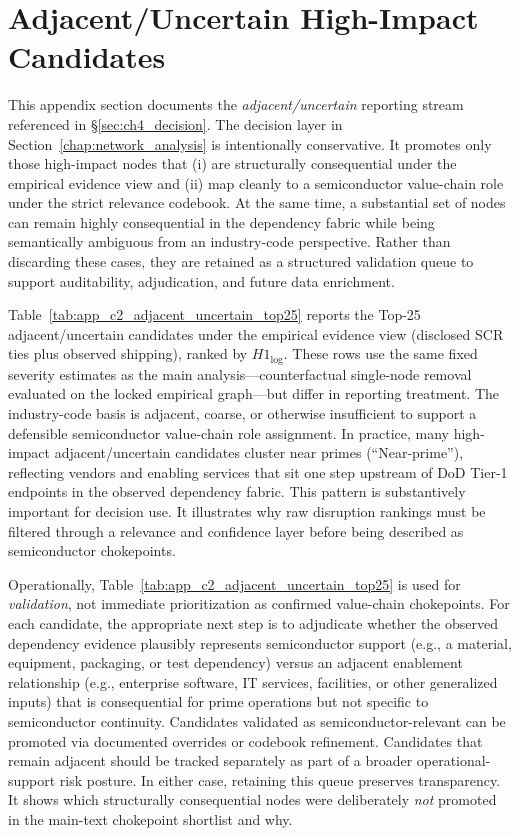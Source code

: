 \section{Adjacent/Uncertain High-Impact Candidates}
\label{app:c3_adjacent_uncertain_validation}

This appendix section documents the \textit{adjacent/uncertain} reporting stream referenced in \S\ref{sec:ch4_decision}. The decision layer in Section~\ref{chap:network_analysis} is intentionally conservative. It promotes only those high-impact nodes that (i) are structurally consequential under the empirical evidence view and (ii) map cleanly to a semiconductor value-chain role under the strict relevance codebook. At the same time, a substantial set of nodes can remain highly consequential in the dependency fabric while being semantically ambiguous from an industry-code perspective. Rather than discarding these cases, they are retained as a structured validation queue to support auditability, adjudication, and future data enrichment.

Table~\ref{tab:app_c2_adjacent_uncertain_top25} reports the Top-25 adjacent/uncertain candidates under the empirical evidence view (disclosed SCR ties plus observed shipping), ranked by $H1_{\log}$. These rows use the same fixed severity estimates as the main analysis---counterfactual single-node removal evaluated on the locked empirical graph---but differ in reporting treatment. The industry-code basis is adjacent, coarse, or otherwise insufficient to support a defensible semiconductor value-chain role assignment. In practice, many high-impact adjacent/uncertain candidates cluster near primes (``Near-prime''), reflecting vendors and enabling services that sit one step upstream of DoD Tier-1 endpoints in the observed dependency fabric. This pattern is substantively important for decision use. It illustrates why raw disruption rankings must be filtered through a relevance and confidence layer before being described as semiconductor chokepoints.

Operationally, Table~\ref{tab:app_c2_adjacent_uncertain_top25} is used for \textit{validation}, not immediate prioritization as confirmed value-chain chokepoints. For each candidate, the appropriate next step is to adjudicate whether the observed dependency evidence plausibly represents semiconductor support (e.g., a material, equipment, packaging, or test dependency) versus an adjacent enablement relationship (e.g., enterprise software, IT services, facilities, or other generalized inputs) that is consequential for prime operations but not specific to semiconductor continuity. Candidates validated as semiconductor-relevant can be promoted via documented overrides or codebook refinement. Candidates that remain adjacent should be tracked separately as part of a broader operational-support risk posture. In either case, retaining this queue preserves transparency. It shows which structurally consequential nodes were deliberately \emph{not} promoted in the main-text chokepoint shortlist and why.


